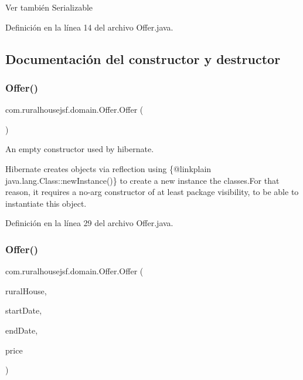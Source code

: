 \begin{DoxySeeAlso}{Ver también}
Serializable 
\end{DoxySeeAlso}


Definición en la línea 14 del archivo Offer.\+java.



\subsection{Documentación del constructor y destructor}
\mbox{\label{classcom_1_1ruralhousejsf_1_1domain_1_1_offer_aa25c14124afd5f3f53c26ef4a564397d}} 
\subsubsection{\texorpdfstring{Offer()}{Offer()}\hspace{0.1cm}{\footnotesize\ttfamily [1/3]}}
{\footnotesize\ttfamily com.\+ruralhousejsf.\+domain.\+Offer.\+Offer (\begin{DoxyParamCaption}{ }\end{DoxyParamCaption})\hspace{0.3cm}{\ttfamily [package]}}



An empty constructor used by hibernate. 

Hibernate creates objects via reflection using \{@linkplain java.\+lang.\+Class\+::new\+Instance()\} to create a new instance the classes.\+For that reason, it requires a no-\/arg constructor of at least package visibility, to be able to instantiate this object. 

Definición en la línea 29 del archivo Offer.\+java.

\mbox{\label{classcom_1_1ruralhousejsf_1_1domain_1_1_offer_ac2559262a3321b69ab5abb4ae28ade81}} 
\subsubsection{\texorpdfstring{Offer()}{Offer()}\hspace{0.1cm}{\footnotesize\ttfamily [2/3]}}
{\footnotesize\ttfamily com.\+ruralhousejsf.\+domain.\+Offer.\+Offer (\begin{DoxyParamCaption}\item[{\mbox{\hyperlink{classcom_1_1ruralhousejsf_1_1domain_1_1_rural_house}{Rural\+House}}}]{rural\+House,  }\item[{Local\+Date}]{start\+Date,  }\item[{Local\+Date}]{end\+Date,  }\item[{double}]{price }\end{DoxyParamCaption})}



